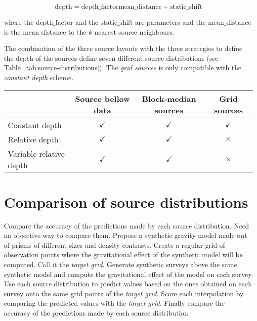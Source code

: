 \documentclass[twocolumn]{article}
\begin{document}
\begin{equation}
    \textrm{depth} =
        \textrm{depth_factor} \textrm{mean_distance} + \textrm{static_shift}
\end{equation}

\noindent where the $\textrm{depth_factor}$ and the $\textrm{static_shift}$ are
parameters and the $\textrm{mean_distance}$ is the mean distance to the $k$ nearest
source neighbours.


The combination of the three source layouts with the three strategies to define the
depth of the sources define seven different source distributions
(see Table~\ref{tab:source-distributions}).
The \emph{grid sources} is only compatible with the \emph{constant depth} scheme.


\begin{table*}
    \begin{minipage}{80mm}
        \caption{
            Source distributions as combinations of source layouts and depth
            strategies.
        }
        \label{tab:source-distributions}
        \begin{tabular}{lccc}
            & Source bellow data & Block-median sources & Grid sources \\ \hline
            Constant depth          & $\checkmark$ & $\checkmark$ & $\checkmark$ \\
            Relative depth          & $\checkmark$ & $\checkmark$ & $\times$     \\
            Variable relative depth & $\checkmark$ & $\checkmark$ & $\times$     \\
        \end{tabular}
    \end{minipage}
\end{table*}



\section{Comparison of source distributions}

Compare the accuracy of the predictions made by each source distribution.
Need an objective way to compare them.
Propose a synthetic gravity model made out of prisms of different sizes and density
contrasts.
Create a regular grid of observation points where the gravitational effect of the
synthetic model will be computed.
Call it the \emph{target grid}.
Generate synthetic surveys above the same synthetic model and compute the gravitational
effect of the model on each survey.
Use each source distribution to predict values based on the ones obtained on each survey
onto the same grid points of the \emph{target grid}.
Score each interpolation by comparing the predicted values with the \emph{target grid}.
Finally compare the accuracy of the predictions made by each source distribution.
\end{document}
